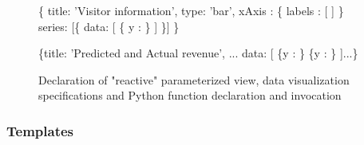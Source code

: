 \begin{figure*}
\begin{minipage}[c]{6cm}
\begin{minipage}[c]{7cm}
\begin{code}
  \{
    title: 'Visitor information',
    type: 'bar',
    xAxis : \{ 
      labels : [
        ]
    \}
    series: [\{
      data: [ 
          \{
            y  : 
          \}
         ]
    \}]
  \}
\end{code}
\vspace*{-0.2cm}
\vspace*{0cm}
\label{figure:running-example:age-group-template}


\end{minipage}
\begin{minipage}[c]{7cm}
\begin{code}
\{title: 'Predicted and Actual revenue',
  ...
  data: [ 
    \{y :  \}
    \{y :  \}
  ]...\}
\end{code}
\vspace*{-0.2cm}
\vspace*{0cm}
\label{figure:running-example:actual-and-predicted-revenue}
\end{minipage}
\end{minipage}
\vspace*{-0.05cm}
\caption{Declaration of "reactive" parameterized view, data visualization specifications and Python function declaration and invocation}
\vspace*{-0.3cm}
\end{figure*}

\subsubsection*{Templates}
\label{section:template}


